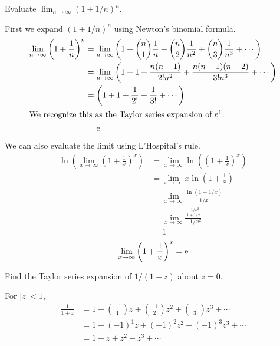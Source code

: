 \begin{Example}
  Evaluate $ \lim_{n \to \infty} (1 + 1/n)^n$.

  First we expand $(1 + 1/n)^n$ using Newton's binomial formula.
  \begin{align*}
    \lim_{n \to \infty} \left(1 + \frac{1}{n} \right)^n 
    &= \lim_{n \to \infty} \left( 1 + \binom{n}{1} \frac{1}{n} +
      \binom{n}{2} \frac{1}{n^2} + \binom{n}{3} \frac{1}{n^3} + \cdots  \right) 
    \\
    &= \lim_{n \to \infty} \left( 1 + 1 + \frac{n (n-1)}{2! n^2} +
      \frac{n (n-1) (n-2)}{3! n^3} + \cdots \right) 
    \\
    &= \left( 1 + 1 + \frac{1}{2!} + \frac{1}{3!} + \cdots \right) 
    \\
    \intertext{We recognize this as the Taylor series expansion of $\mathop{\mathrm{e}}\nolimits^1$.}
    &= \mathop{\mathrm{e}}\nolimits
  \end{align*}
  We can also evaluate the limit using L'Hospital's rule.
  \begin{align*}
    \ln \left(\lim_{x \to \infty} \left(1 + \frac{1}{x} \right)^x \right)
    &= \lim_{x \to \infty} \ln \left( \left( 1 + \frac{1}{x} \right)^x \right) 
    \\
    &= \lim_{x \to \infty} x \ln\left( 1 + \frac{1}{x} \right) 
    \\
    &= \lim_{x \to \infty} \frac{\ln(1 + 1/x)}{1/x}  
    \\
    &= \lim_{x \to \infty} \frac{\frac{-1/x^2}{1 + 1/x}}{-1/x^2} 
    \\
    &= 1
  \end{align*}
  \[
  \lim_{x \to \infty} \left(1 + \frac{1}{x} \right)^x = \mathop{\mathrm{e}}\nolimits
  \]
\end{Example}





\begin{Example}
  Find the Taylor series expansion of $1/(1 + z)$ about $z = 0$.

  For $|z| < 1$,
  \begin{align*}
    \frac{1}{1 + z} &= 1 + \binom{-1}{1} z + \binom{-1}{2} z^2 +
    \binom{-1}{3} z^3 + \cdots 
    \\
    &= 1 + (-1)^1 z + (-1)^2 z^2 + (-1)^3 z^3 + \cdots 
    \\
    &= 1 - z + z^2 - z^3 + \cdots
  \end{align*}
\end{Example}






